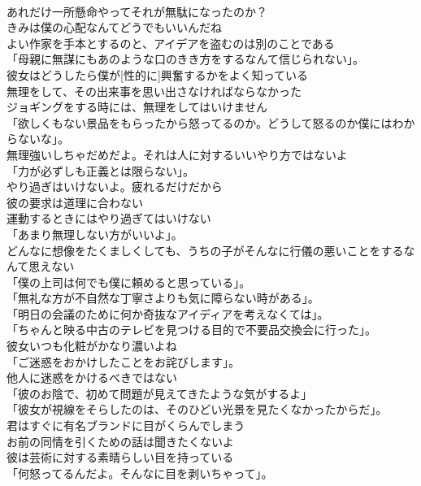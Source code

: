 \documentclass[8pt]{extreport}
\begin{document}
\begin{CJK}{UTF8}{min}
\\	あれだけ一所懸命やってそれが無駄になったのか？	
\\	きみは僕の心配なんてどうでもいいんだね	
\\	よい作家を手本とするのと、アイデアを盗むのは別のことである	
\\	「母親に無謀にもあのような口のきき方をするなんて信じられない」。	
\\	彼女はどうしたら僕が[性的に]興奮するかをよく知っている	
\\	無理をして、その出来事を思い出さなければならなかった	
\\	ジョギングをする時には、無理をしてはいけません	
\\	「欲しくもない景品をもらったから怒ってるのか。どうして怒るのか僕にはわからないな」。	
\\	無理強いしちゃだめだよ。それは人に対するいいやり方ではないよ	
\\	「力が必ずしも正義とは限らない」。	
\\	やり過ぎはいけないよ。疲れるだけだから	
\\	彼の要求は道理に合わない	
\\	運動するときにはやり過ぎてはいけない	
\\	「あまり無理しない方がいいよ」。	
\\	どんなに想像をたくましくしても、うちの子がそんなに行儀の悪いことをするなんて思えない	
\\	「僕の上司は何でも僕に頼めると思っている」。	
\\	「無礼な方が不自然な丁寧さよりも気に障らない時がある」。	
\\	「明日の会議のために何か奇抜なアイディアを考えなくては」。	
\\	「ちゃんと映る中古のテレビを見つける目的で不要品交換会に行った」。	
\\	彼女いつも化粧がかなり濃いよね	
\\	「ご迷惑をおかけしたことをお詫びします」。	
\\	他人に迷惑をかけるべきではない	
\\	「彼のお陰で、初めて問題が見えてきたような気がするよ」	
\\	「彼女が視線をそらしたのは、そのひどい光景を見たくなかったからだ」。	
\\	君はすぐに有名ブランドに目がくらんでしまう	
\\	お前の同情を引くための話は聞きたくないよ	
\\	彼は芸術に対する素晴らしい目を持っている	
\\	「何怒ってるんだよ。そんなに目を剥いちゃって」。	

\end{CJK}
\end{document}
